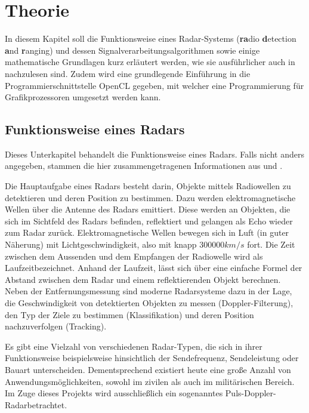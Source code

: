 \documentclass[a4paper,12pt,oneside,german,toc=bibliography]{scrbook}
\theoremstyle{definition}
\theoremstyle{plain}
\numberwithin{equation}{section}
\begin{document}


\tableofcontents


\chapter{Theorie}
In diesem Kapitel soll die Funktionsweise eines Radar-Systems (\textbf{ra}dio \textbf{d}etection \textbf{a}nd \textbf{r}anging) und dessen Signalverarbeitungsalgorithmen sowie einige mathematische Grundlagen kurz erläutert werden, wie sie ausführlicher auch in \cites{Richards,RSH,Ludloff} nachzulesen sind. Zudem wird eine grundlegende Einführung in die Programmierschnittstelle OpenCL gegeben, mit welcher eine Programmierung für Grafikprozessoren umgesetzt werden kann.

\section{Funktionsweise eines Radars} 

Dieses Unterkapitel behandelt die Funktionsweise eines Radars. Falls nicht anders angegeben, stammen die hier zusammengetragenen Informationen aus \cite[Kapitel 1]{Richards} und \cite[Kapitel 1]{Ludloff}.

Die Hauptaufgabe eines Radars besteht darin, Objekte mittels Radiowellen zu detektieren und deren Position zu bestimmen. Dazu werden elektromagnetische Wellen über die Antenne des Radars emittiert. Diese werden an Objekten, die sich im Sichtfeld des Radars befinden, reflektiert und gelangen als \glqq  Echo \grqq wieder zum Radar zurück. Elektromagnetische Wellen bewegen sich in Luft (in guter Näherung) mit Lichtgeschwindigkeit, also mit knapp \(300000 km/s\) fort. Die Zeit zwischen dem Aussenden und dem Empfangen der Radiowelle wird als \glqq Laufzeit\grqq bezeichnet. Anhand der Laufzeit, lässt sich über eine einfache Formel der Abstand zwischen dem Radar und einem reflektierenden Objekt berechnen. Neben der Entfernungsmessung sind moderne Radarsysteme dazu in der Lage, die Geschwindigkeit von detektierten Objekten zu messen (Doppler-Filterung), den Typ der Ziele zu bestimmen (Klassifikation) und deren Position nachzuverfolgen (Tracking).

Es gibt eine Vielzahl von verschiedenen Radar-Typen, die sich in ihrer Funktionsweise beispielsweise hinsichtlich der Sendefrequenz, Sendeleistung  oder Bauart unterscheiden. Dementsprechend existiert heute eine große Anzahl von Anwendungsmöglichkeiten, sowohl im zivilen als auch im militärischen Bereich. Im Zuge dieses Projekts wird ausschließlich ein sogenanntes \glqq Puls-Doppler-Radar\grqq  betrachtet. 
\end{document}
